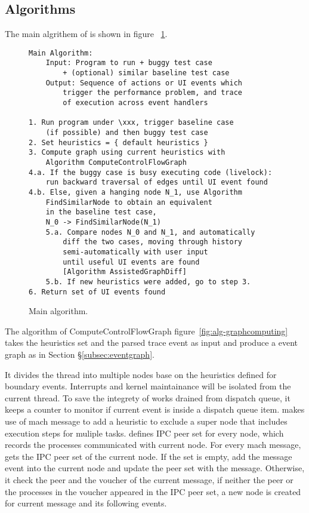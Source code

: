 \subsection{\xxx Algorithms} 
The main algrithem of \xxx is shown in figure ~\ref{fig:alg-main}.
\begin{figure}[H]
\footnotesize\begin{verbatim}
Main Algorithm:
    Input: Program to run + buggy test case
        + (optional) similar baseline test case
    Output: Sequence of actions or UI events which
        trigger the performance problem, and trace
        of execution across event handlers

1. Run program under \xxx, trigger baseline case
    (if possible) and then buggy test case
2. Set heuristics = { default heuristics }
3. Compute graph using current heuristics with
    Algorithm ComputeControlFlowGraph
4.a. If the buggy case is busy executing code (livelock):
    run backward traversal of edges until UI event found
4.b. Else, given a hanging node N_1, use Algorithm
    FindSimilarNode to obtain an equivalent
    in the baseline test case,
    N_0 -> FindSimilarNode(N_1)
    5.a. Compare nodes N_0 and N_1, and automatically
        diff the two cases, moving through history
        semi-automatically with user input
	    until useful UI events are found
        [Algorithm AssistedGraphDiff]
    5.b. If new heuristics were added, go to step 3.
6. Return set of UI events found
\end{verbatim}
    \caption{Main \xxx algorithm.}
    \label{fig:alg-main}
\end{figure}

The algorithm of ComputeControlFlowGraph figure~\ref{fig:alg-graphcomputing}
takes the heuristics set and the parsed trace event as input and produce a
event graph as in Section \S\ref{subsec:eventgraph}.

It divides the thread into multiple nodes base on the heuristics defined for
boundary events. Interrupts and kernel maintainance will be isolated from the
current thread. To save the integrety of works drained from dispatch queue, it
keeps a counter to monitor if current event is inside a dispatch queue item.
\xxx makes use of mach message to add a heuristic to exclude a super node that
includes execution steps for muliple tasks. \xxx defines IPC peer set for every
node, which records the processes communicated with current node. For every
mach message, \xxx gets the IPC peer set of the current node. If the set is
empty, \xxx add the message event into the current node and update the peer set
with the message. Otherwise, it check the peer and the voucher of the current
message, if neither the peer or the processes in the voucher appeared in the IPC
peer set, a new node is created for current message and its following events.

